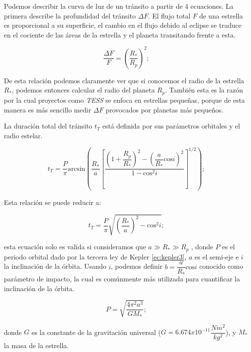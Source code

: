 Podemos describir la curva de luz de un tránsito a partir de 4 ecuaciones. La primera describe la profundidad del tránsito $\Delta F$. El flujo total $F$ de una estrella es proporcional a su superficie, el cambio en el flujo debido al eclipse se traduce en el cociente de las áreas de la estrella y el planeta transitando frente a esta.

\begin{equation}
  \displaystyle \dfrac{\Delta F}{F}=\left(\dfrac{R_*}{R_p} \right)^{2} ;
\end{equation}

De esta relación podemos claramente ver que si conocemos el radio de la estrella $R_{*}$, podemos entonces calcular el radio del planeta $R_{p}$. También esta es la razón por la cual proyectos como \textit{TESS} se enfoca en estrellas pequeñas, porque de esta manera es más sencillo medir $\Delta F$ provocados por planetas más pequeños.

La duración total del tránsito $t_{T}$ está definida por sus parámetros orbitales y el radio estelar.

\begin{equation}
\label{ec:tiempoTransito}
\displaystyle t_{T}=\dfrac{P}{\pi} \mbox{arcsin} \left(\dfrac{R_{*}}{a}\left[ \dfrac{\left( 1+\dfrac{R_{p}}{R_{*}}\right)^{2}-\left( \dfrac{a}{R_{*}} \mbox{cos} i\right)^{2}}{1-\mbox{cos}^{2}i} \right]^{1/2}  \right); 
\end{equation}

Esta relación se puede reducir a:

\begin{equation}
\label{ec:tiempoTransitoReduc}
\displaystyle t_{T}=\dfrac{P}{\pi}\sqrt{\left(\dfrac{R_{*}}{a} \right)^{2}- \mbox{cos}^{2}i};
\end{equation}

esta ecuación solo es valida si consideramos que $a\gg R_{*}\gg R_{p}$ \cite{winn2010transits}, donde $P$ es el periodo orbital dado por la tercera ley de Kepler \ref{ec:kepler3}, $a$ es el semi-eje e $i$ la inclinación de la órbita. Usando $i$, podemos definir $b=\dfrac{a}{R_{*}}\mbox{cos}i$ conocido como parámetro de impacto, la cual es comúnmente más utilizada para cuantificar la inclinación de la órbita. 

\begin{equation}
  \label{ec:kepler3}
  \displaystyle P=\sqrt{\dfrac{4\pi^{2}a^{3}}{GM_{*}}};
  \end{equation} 
  
donde $G$ es la constante de la gravitación universal ($G=6.674x10^{-11}\dfrac{Nm^{2}}{kg^{2}}$), y $M_{*}$ la masa de la estrella.

